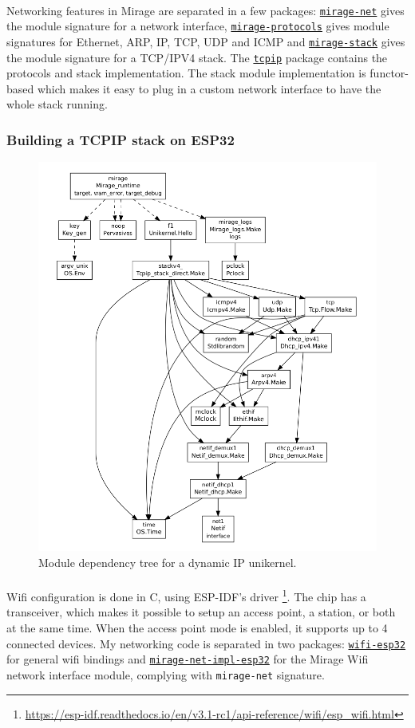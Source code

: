 \documentclass[a4paper]{article}
\begin{document}
\paragraph{}
Networking features in Mirage are separated in a few packages: \href{https://github.com/mirage/mirage-net}{\texttt{mirage-net}} gives the module signature for a network interface, \href{https://github.com/mirage/mirage-protocols}{\texttt{mirage-protocols}} gives module signatures for Ethernet, ARP, IP, TCP, UDP and ICMP and \href{https://github.com/mirage/mirage-stack}{\texttt{mirage-stack}} gives the module signature for a TCP/IPV4 stack. The \href{https://github.com/mirage/mirage-tcpip}{\texttt{tcpip}} package contains the protocols and stack implementation. The stack module implementation is functor-based which makes it easy to plug in a custom network interface to have the whole stack running.
\subsubsection{Building a TCPIP stack on ESP32}
\begin{figure}
\includegraphics[width=0.3\columnwidth]{unik.png}
\caption{Module dependency tree for a dynamic IP unikernel.}
\end{figure}
\paragraph{}
Wifi configuration is done in C, using ESP-IDF's driver \footnote{\url{https://esp-idf.readthedocs.io/en/v3.1-rc1/api-reference/wifi/esp_wifi.html}}. The chip has a transceiver, which makes it possible to setup an access point, a station, or both at the same time. When the access point mode is enabled, it supports up to 4 connected devices. My networking code is separated in two packages: \href{https://github.com/well-typed-lightbulbs/wifi-esp32}{\texttt{wifi-esp32}} for general wifi bindings and \href{https://github.com/well-typed-lightbulbs/mirage-net-impl-esp32}{\texttt{mirage-net-impl-esp32}} for the Mirage Wifi network interface module, complying with \texttt{mirage-net} signature. 
\end{document}
